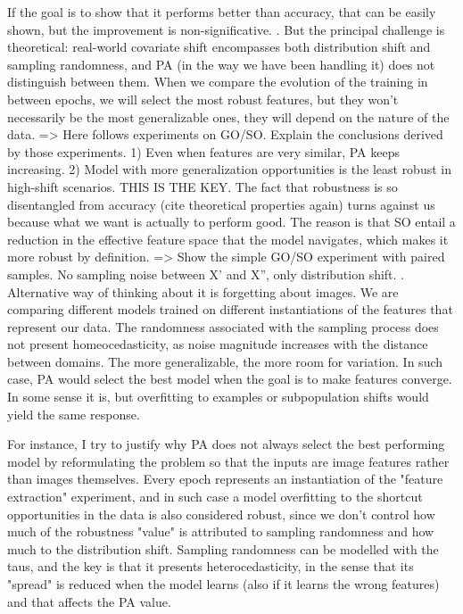 If the goal is to show that it performs better than accuracy, that can be easily shown, but the improvement is non-significative.
. But the principal challenge is theoretical: real-world covariate shift encompasses both distribution shift and sampling randomness, and PA (in the way we have been handling it) does not distinguish between them. When we compare the evolution of the training in between epochs, we will select the most robust features, but they won't necessarily be the most generalizable ones, they will depend on the nature of the data.
=> Here follows experiments on GO/SO. Explain the conclusions derived by those experiments.
    1) Even when features are very similar, PA keeps increasing.
    2) Model with more generalization opportunities is the least robust in high-shift scenarios. THIS IS THE KEY. The fact that robustness is so disentangled from accuracy (cite theoretical properties again) turns against us because what we want is actually to perform good. The reason is that SO entail a reduction in the effective feature space that the model navigates, which makes it more robust by definition.
=> Show the simple GO/SO experiment with paired samples. No sampling noise between X' and X'', only distribution shift.
. Alternative way of thinking about it is forgetting about images. We are comparing different models
 trained on different instantiations of the features that represent our data. The randomness 
 associated with the sampling process does not present homeocedasticity, as noise magnitude 
 increases with the distance between domains. The more generalizable, the more room for variation. 
 In such case, PA would select the best model when the goal is to make features converge. In some 
 sense it is, but overfitting to examples or subpopulation shifts would yield the same response.

 For instance, I try to justify why PA does not always select the best performing model by reformulating the problem so that the inputs are image features rather than images themselves. Every epoch represents an instantiation of the "feature extraction" experiment, and in such case a model overfitting to the shortcut opportunities in the data is also considered robust, since we don't control how much of the robustness "value" is attributed to sampling randomness and how much to the distribution shift. Sampling randomness can be modelled with the taus, and the key is that it presents heterocedasticity, in the sense that its "spread" is reduced when the model learns (also if it learns the wrong features) and that affects the PA value.

